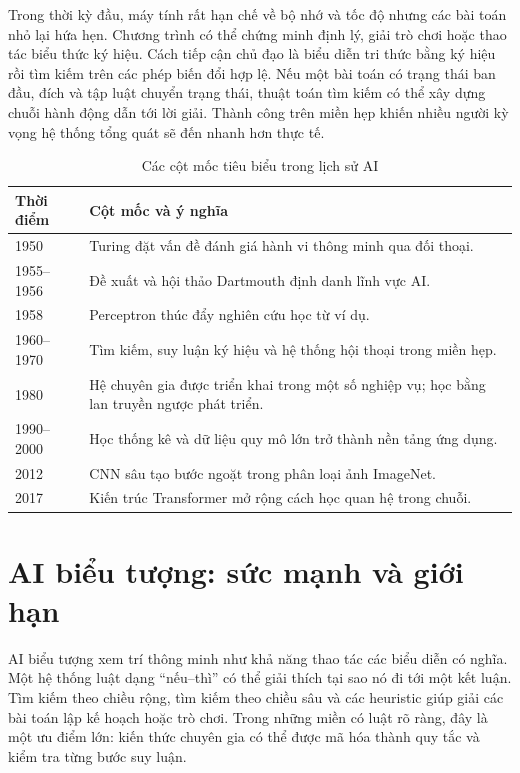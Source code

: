 \documentclass[12pt,a4paper]{report}
\begin{document}
Trong thời kỳ đầu, máy tính rất hạn chế về bộ nhớ và tốc độ nhưng các bài toán nhỏ lại hứa hẹn. Chương trình có thể chứng minh định lý, giải trò chơi hoặc thao tác biểu thức ký hiệu. Cách tiếp cận chủ đạo là biểu diễn tri thức bằng ký hiệu rồi tìm kiếm trên các phép biến đổi hợp lệ. Nếu một bài toán có trạng thái ban đầu, đích và tập luật chuyển trạng thái, thuật toán tìm kiếm có thể xây dựng chuỗi hành động dẫn tới lời giải. Thành công trên miền hẹp khiến nhiều người kỳ vọng hệ thống tổng quát sẽ đến nhanh hơn thực tế.

\begin{table}[htbp]\centering\caption{Các cột mốc tiêu biểu trong lịch sử AI}\label{tab:history-timeline}
\begin{tabularx}{\textwidth}{p{1.7cm}X}
\toprule\textbf{Thời điểm} & \textbf{Cột mốc và ý nghĩa}\\\midrule
1950 & Turing đặt vấn đề đánh giá hành vi thông minh qua đối thoại.\\
1955--1956 & Đề xuất và hội thảo Dartmouth định danh lĩnh vực AI.\\
1958 & Perceptron thúc đẩy nghiên cứu học từ ví dụ.\\
1960--1970 & Tìm kiếm, suy luận ký hiệu và hệ thống hội thoại trong miền hẹp.\\
1980 & Hệ chuyên gia được triển khai trong một số nghiệp vụ; học bằng lan truyền ngược phát triển.\\
1990--2000 & Học thống kê và dữ liệu quy mô lớn trở thành nền tảng ứng dụng.\\
2012 & CNN sâu tạo bước ngoặt trong phân loại ảnh ImageNet.\\
2017 & Kiến trúc Transformer mở rộng cách học quan hệ trong chuỗi.\\
\bottomrule\end{tabularx}\end{table}

\section{AI biểu tượng: sức mạnh và giới hạn}
AI biểu tượng xem trí thông minh như khả năng thao tác các biểu diễn có nghĩa. Một hệ thống luật dạng ``nếu--thì'' có thể giải thích tại sao nó đi tới một kết luận. Tìm kiếm theo chiều rộng, tìm kiếm theo chiều sâu và các heuristic giúp giải các bài toán lập kế hoạch hoặc trò chơi. Trong những miền có luật rõ ràng, đây là một ưu điểm lớn: kiến thức chuyên gia có thể được mã hóa thành quy tắc và kiểm tra từng bước suy luận.
\end{document}
